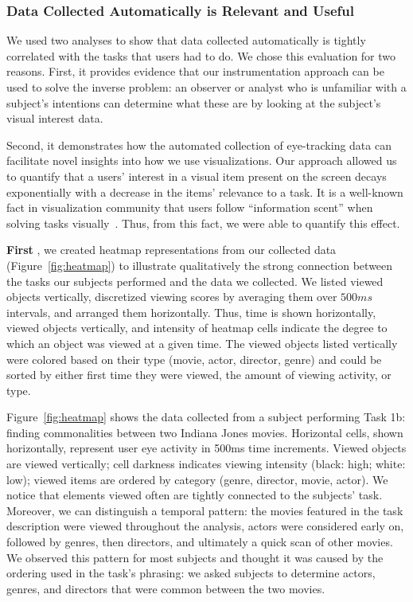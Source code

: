 \subsubsection{Data Collected Automatically is Relevant and Useful}
\label{sec:EvalDataCollected}

We used two analyses to show that data collected automatically is tightly correlated with the tasks that users had to do. We chose this evaluation for two reasons. First, it provides evidence that our instrumentation approach can be used to solve the inverse problem: an observer or analyst who is unfamiliar with a subject's intentions can determine what these are by looking at the subject's visual interest data. 

Second, it demonstrates how the automated collection of eye-tracking data can facilitate novel insights into how we use visualizations. Our approach allowed us to quantify that a users' interest in a visual item present on the screen decays exponentially with a decrease in the items' relevance to a task. It is a well-known fact in visualization community that users follow ``information scent'' when solving tasks visually~\cite{informationscent2003}. Thus, from this fact, we were able to quantify this effect. 
 
\vspace{2mm}\noindent
\textbf{First }, we created heatmap representations from our collected data (Figure~\ref{fig:heatmap}) to illustrate qualitatively the strong connection between the tasks our subjects performed and the data we collected. We listed viewed objects vertically, discretized viewing scores by averaging them over $500ms$ intervals, and arranged them horizontally. Thus, time is shown horizontally, viewed objects vertically, and intensity of heatmap cells indicate the degree to which an object was viewed at a given time. The viewed objects listed vertically were colored based on their type (movie, actor, director, genre) and could be sorted by either first time they were viewed, the amount of viewing activity, or type.

Figure~\ref{fig:heatmap} shows the data collected from a subject performing Task 1b: finding commonalities between two Indiana Jones movies. Horizontal cells, shown horizontally, represent user eye activity in 500ms time increments. Viewed objects are viewed vertically; cell darkness indicates viewing intensity (black: high; white: low); viewed items are ordered by category (genre, director, movie, actor). We notice that elements viewed often are tightly connected to the subjects'  task.   Moreover, we can distinguish a temporal pattern: the movies featured in the task description were viewed throughout the analysis, actors were considered early on, followed by genres, then directors, and ultimately a quick scan of other movies. We observed this pattern for most subjects and thought it was caused by the ordering used in the task's phrasing: we asked subjects to determine actors, genres, and directors that were common between the two movies.   

